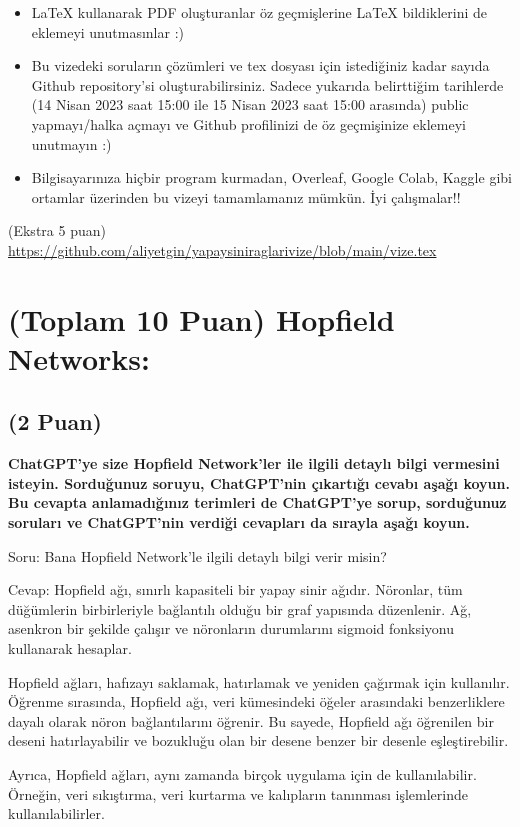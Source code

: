 \documentclass[11pt]{article}
\begin{document}
\begin{itemize}
    \item LaTeX kullanarak PDF oluşturanlar öz geçmişlerine LaTeX bildiklerini de eklemeyi unutmasınlar :)
    \item Bu vizedeki soruların çözümleri ve tex dosyası için istediğiniz kadar sayıda Github repository'si oluşturabilirsiniz. Sadece yukarıda belirttiğim tarihlerde (14 Nisan 2023 saat 15:00 ile 15 Nisan 2023 saat 15:00 arasında) public yapmayı/halka açmayı ve Github profilinizi de öz geçmişinize eklemeyi unutmayın :)
    \item Bilgisayarınıza hiçbir program kurmadan, Overleaf, Google Colab, Kaggle gibi ortamlar üzerinden bu vizeyi tamamlamanız mümkün. İyi çalışmalar!!
\end{itemize}

(Ekstra 5 puan) \url{https://github.com/aliyetgin/yapaysiniraglarivize/blob/main/vize.tex}

\newpage
\section{(Toplam 10 Puan) Hopfield Networks:}

\subsection{(2 Puan)} \textbf{ChatGPT’ye size Hopfield Network’ler ile ilgili detaylı bilgi vermesini isteyin. Sorduğunuz soruyu, ChatGPT'nin çıkartığı cevabı aşağı koyun. Bu cevapta anlamadığınız terimleri de ChatGPT’ye sorup, sorduğunuz soruları ve ChatGPT’nin verdiği cevapları da sırayla aşağı koyun.}

Soru: Bana Hopfield Network’le ilgili detaylı bilgi verir misin?

Cevap: Hopfield ağı, sınırlı kapasiteli bir yapay sinir ağıdır. Nöronlar, tüm düğümlerin birbirleriyle bağlantılı olduğu bir graf yapısında düzenlenir. Ağ, asenkron bir şekilde çalışır ve nöronların durumlarını sigmoid fonksiyonu kullanarak hesaplar.

Hopfield ağları, hafızayı saklamak, hatırlamak ve yeniden çağırmak için kullanılır. Öğrenme sırasında, Hopfield ağı, veri kümesindeki öğeler arasındaki benzerliklere dayalı olarak nöron bağlantılarını öğrenir. Bu sayede, Hopfield ağı öğrenilen bir deseni hatırlayabilir ve bozukluğu olan bir desene benzer bir desenle eşleştirebilir.

Ayrıca, Hopfield ağları, aynı zamanda birçok uygulama için de kullanılabilir. Örneğin, veri sıkıştırma, veri kurtarma ve kalıpların tanınması işlemlerinde kullanılabilirler.
\end{document}
